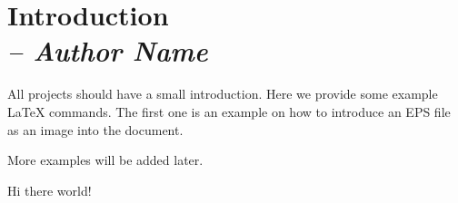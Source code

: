 \chapter{Introduction \\
\small{\textit{-- Author Name}}
\label{Chapter::Introduction}}

All projects should have a small introduction.  Here we provide some
example LaTeX commands.  The first one is an example on how to
introduce an EPS file as an image into the document.


More examples will be added later.

\newpage

Hi there world!
